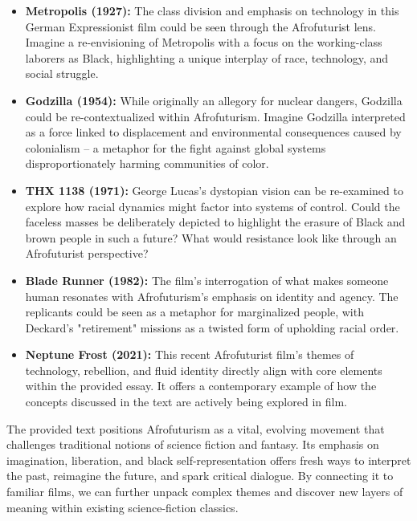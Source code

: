 \documentclass[11pt,fleqn]{book}
\begin{document}
\begin{itemize}
\item \textbf{Metropolis (1927):} The class division and emphasis on technology in this German Expressionist film could be seen through the Afrofuturist lens. Imagine a re-envisioning of Metropolis with a focus on the working-class laborers as Black, highlighting a unique interplay of race, technology, and social struggle.  

\item \textbf{Godzilla (1954):} While originally an allegory for nuclear dangers, Godzilla could be re-contextualized within Afrofuturism. Imagine  Godzilla interpreted as a force linked to displacement and environmental consequences caused by colonialism –  a metaphor for the fight against global systems disproportionately harming communities of color. 

\item \textbf{THX 1138 (1971):}  George Lucas's dystopian vision can be re-examined to explore how racial dynamics might factor into  systems of control. Could the faceless masses be deliberately depicted to highlight the erasure of  Black and brown people in such a future? What would resistance look like through an Afrofuturist perspective?

\item \textbf{Blade Runner (1982):} The film's interrogation of what makes someone human resonates  with  Afrofuturism's emphasis on identity and agency. The replicants could be seen as a metaphor for marginalized people, with Deckard's "retirement" missions as a twisted form of upholding racial order. 

\item \textbf{Neptune Frost (2021):} This recent Afrofuturist film's themes of technology, rebellion, and fluid identity directly align with core elements within the provided essay. It offers a contemporary example of how the concepts discussed in the text are actively being explored in film. 
\end{itemize}

\vspace{5pt}

The provided text positions Afrofuturism as a vital, evolving movement that challenges traditional notions of science fiction and fantasy. Its emphasis on imagination, liberation, and black self-representation offers fresh ways to interpret the past, reimagine the future, and spark critical dialogue. By connecting it to familiar films, we can further unpack complex themes and discover new layers of meaning within existing science-fiction classics. 
\end{document}
